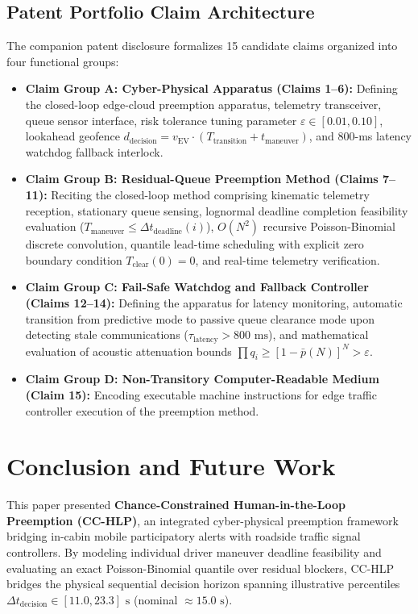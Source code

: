 \documentclass[journal,10pt,twocolumn]{IEEEtran}
\begin{document}
\subsection{Patent Portfolio Claim Architecture}
The companion patent disclosure formalizes 15 candidate claims organized into four functional groups:
\begin{itemize}
    \item \textbf{Claim Group A: Cyber-Physical Apparatus (Claims 1--6):} Defining the closed-loop edge-cloud preemption apparatus, telemetry transceiver, queue sensor interface, risk tolerance tuning parameter $\varepsilon \in [0.01, 0.10]$, lookahead geofence $d_{\text{decision}} = v_{\text{EV}} \cdot (T_{\text{transition}} + t_{\text{maneuver}})$, and 800-ms latency watchdog fallback interlock.
    \item \textbf{Claim Group B: Residual-Queue Preemption Method (Claims 7--11):} Reciting the closed-loop method comprising kinematic telemetry reception, stationary queue sensing, lognormal deadline completion feasibility evaluation ($T_{\text{maneuver}} \le \Delta t_{\text{deadline}}(i)$), $O(N^2)$ recursive Poisson-Binomial discrete convolution, quantile lead-time scheduling with explicit zero boundary condition $T_{\text{clear}}(0) = 0$, and real-time telemetry verification.
    \item \textbf{Claim Group C: Fail-Safe Watchdog and Fallback Controller (Claims 12--14):} Defining the apparatus for latency monitoring, automatic transition from predictive mode to passive queue clearance mode upon detecting stale communications ($\tau_{\text{latency}} > 800\text{ ms}$), and mathematical evaluation of acoustic attenuation bounds $\prod q_i \ge [1 - \bar{p}(N)]^N > \varepsilon$.
    \item \textbf{Claim Group D: Non-Transitory Computer-Readable Medium (Claim 15):} Encoding executable machine instructions for edge traffic controller execution of the preemption method.
\end{itemize}

\section{Conclusion and Future Work}
This paper presented \textbf{Chance-Constrained Human-in-the-Loop Preemption (CC-HLP)}, an integrated cyber-physical preemption framework bridging in-cabin mobile participatory alerts with roadside traffic signal controllers. By modeling individual driver maneuver deadline feasibility and evaluating an exact Poisson-Binomial quantile over residual blockers, CC-HLP bridges the physical sequential decision horizon spanning illustrative percentiles $\Delta t_{\text{decision}} \in [11.0, 23.3]\text{ s}$ (nominal $\approx 15.0\text{ s}$).
\end{document}
